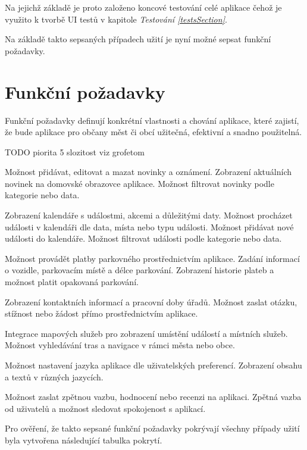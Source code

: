 Na jejichž základě je proto založeno koncové testování celé aplikace čehož je využito k tvorbě UI testů v kapitole \textit{Testování \ref{testsSection}}.

Na základě takto sepsaných případech užití je nyní možné sepsat funkční požadavky.

\section{Funkční požadavky}
Funkční požadavky definují konkrétní vlastnosti a chování aplikace, které zajistí, že bude aplikace pro občany měst či obcí 
užitečná, efektivní a snadno použitelná.

TODO piorita 5 slozitost viz grofetom

Možnost přidávat, editovat a mazat novinky a oznámení.
Zobrazení aktuálních novinek na domovské obrazovce aplikace.
Možnost filtrovat novinky podle kategorie nebo data.

Zobrazení kalendáře s událostmi, akcemi a důležitými daty.
Možnost procházet události v kalendáři dle data, místa nebo typu události.
Možnost přidávat nové události do kalendáře.
Možnost filtrovat události podle kategorie nebo data.

Možnost provádět platby parkovného prostřednictvím aplikace.
Zadání informací o vozidle, parkovacím místě a délce parkování.
Zobrazení historie plateb a možnost platit opakovaná parkování.

Zobrazení kontaktních informací a pracovní doby úřadů.
Možnost zaslat otázku, stížnost nebo žádost přímo prostřednictvím aplikace.

Integrace mapových služeb pro zobrazení umístění událostí a místních služeb.
Možnost vyhledávání tras a navigace v rámci města nebo obce.

Možnost nastavení jazyka aplikace dle uživatelských preferencí.
Zobrazení obsahu a textů v různých jazycích.

Možnost zaslat zpětnou vazbu, hodnocení nebo recenzi na aplikaci.
Zpětná vazba od uživatelů a možnost sledovat spokojenost s aplikací.


Pro ověření, že takto sepsané funkční požadavky pokrývají všechny případy užití byla vytvořena následující tabulka pokrytí.

